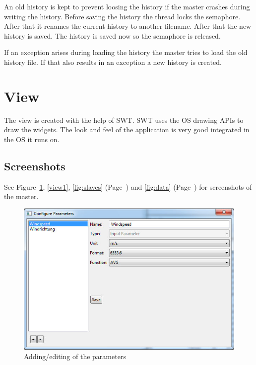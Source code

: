 An old history is kept to prevent loosing the history if the master crashes during writing the history. Before saving the history the thread locks the semaphore. After that it renames the current history to another filename. After that the new history is saved. The history is saved now so the semaphore is released.

If an exception arises during loading the history the master tries to load the old history file. If that also results in an exception a new history is created.

\section{View} %
\label{sec:view}

The view is created with the help of SWT. SWT uses the OS drawing APIs to draw the widgets. The look and feel of the application is very good integrated in the OS it runs on. 

\subsection{Screenshots} %
\label{sub:screenshots}
See Figure~\ref{fig:parameter}, \ref{view1}, \ref{fig:slaves} (Page~\pageref{fig:slaves}) and \ref{fig:data} (Page~\pageref{fig:data}) for screenshots of the master.

\begin{figure}[ht]
    \centering
    \includegraphics[width=\linewidth]{master/parameters.jpg}
    \caption{Adding/editing of the parameters}
    \label{fig:parameter}
\end{figure} 

